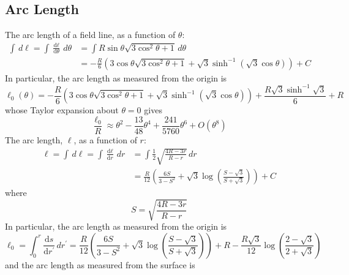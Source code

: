 \documentclass{book}
\newcommand{\deriv}[2]{\frac{\text{d}{#1}}{\text{d}{#2}}}
\begin{document}
\subsection{Arc Length}
The arc length of a field line, as a function of $\theta$:
\begin{equation}
    \begin{aligned}
        \int\,d\ell = \int\deriv{\ell}{\theta}\,d\theta
            &= \int R\sin\theta \sqrt{3\cos^2\theta + 1} \, d\theta \\
            &= -\frac{R}{6}\left(3\cos\theta\sqrt{3\cos^2\theta + 1} + \sqrt{3}\sinh^{-1}(\sqrt{3}\cos\theta)\right) + C
    \end{aligned}
\end{equation}
In particular, the arc length as measured from the origin is
\begin{equation}
    \ell_0(\theta) = -\frac{R}{6}\left(3\cos\theta\sqrt{3\cos^2\theta + 1} + \sqrt{3}\sinh^{-1}(\sqrt{3}\cos\theta)\right) +
                      \frac{R\sqrt{3}\sinh^{-1}\sqrt{3}}{6} + R
\end{equation}
whose Taylor expansion about $\theta = 0$ gives
\begin{equation}
    \frac{\ell_0}{R} \approx \theta^2 - \frac{13}{48}\theta^4 + \frac{241}{5760}\theta^6 + O(\theta^8)
    \label{eqn:arclengthth}
\end{equation}
The arc length, $\ell$, as a function of $r$:
\begin{equation}
    \begin{aligned}
        \ell = \int\,d\ell = \int\deriv{\ell}{r}\,dr
            &= \int \frac12 \sqrt{\frac{4R-3r}{R-r}} \, dr \\
            &= \frac{R}{12}\left(\frac{6S}{3 - S^2} + \sqrt{3}\log\left(\frac{S - \sqrt{3}}{S + \sqrt{3}}\right)\right) + C
    \end{aligned}
\end{equation}
where
\begin{equation}
    S = \sqrt{\frac{4R-3r}{R-r}}
\end{equation}
In particular, the arc length as measured from the origin is
\begin{equation}
    \ell_0 = \int_0^r \deriv{s}{r^\prime} \,dr^\prime
           = \frac{R}{12}\left(\frac{6S}{3 - S^2} + \sqrt{3}\log\left(\frac{S - \sqrt{3}}{S + \sqrt{3}}\right)\right) +
             R - \frac{R\sqrt{3}}{12}\log\left(\frac{2-\sqrt{3}}{2+\sqrt{3}}\right)
\end{equation}
and the arc length as measured from the surface is
\end{document}
